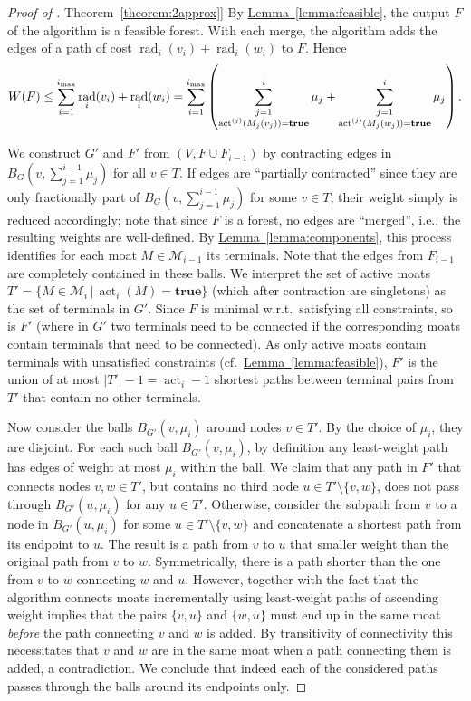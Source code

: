 \documentclass[letterpaper,11pt]{article}
\newcommand{\namedref}[2]{\hyperref[#2]{#1~\ref*{#2}}}
\newcommand{\theoremref}[1]{\namedref{Theorem}{#1}}
\newcommand{\lemmaref}[1]{\namedref{Lemma}{#1}}
\newcommand{\M}{\mathcal{M}}
\DeclareMathOperator{\act}{act}
\DeclareMathOperator{\moat}{rad}
\newcommand{\true}{\mathbf{true}}
\begin{document}
\begin{proof}[Proof of \theoremref{theorem:2approx}]
By \lemmaref{lemma:feasible}, the output $F$ of the algorithm is a feasible
forest. With each merge, the algorithm adds the edges of a path of cost
$\moat_i(v_i)+\moat_i(w_i)$ to $F$. Hence
\begin{equation*}
W(F)\leq  \sum_{i=1}^{i_{\max}}\moat_i(v_i)+\moat_i(w_i)\\
=  \sum_{i=1}^{i_{\max}}\left(\sum_{\substack{j=1\\ \act^{(j)}(M_j(v_j))=\true}}^i
\mu_j +\sum_{\substack{j=1\\ \act^{(j)}(M_j(w_j))=\true}}^i \mu_j\right).
\end{equation*}

We construct $G'$ and $F'$ from $(V,F\cup F_{i-1})$ by contracting edges in
$B_G(v,\sum_{j=1}^{i-1}\mu_j)$ for all $v\in T$. If edges are ``partially
contracted'' since they are only fractionally part of
$B_G(v,\sum_{j=1}^{i-1}\mu_j)$ for some $v\in T$, their weight simply is
reduced accordingly; note that since $F$ is a forest, no edges are ``merged'',
i.e., the resulting weights are well-defined. By \lemmaref{lemma:components},
this process identifies for each moat $M\in \M_{i-1}$ its terminals. Note that
the edges from $F_{i-1}$ are completely contained in these balls. We interpret
the set of active moats $T'=\{M\in \M_i\,|\,\act_i(M)=\true\}$ (which after
contraction are singletons) as the set of terminals in $G'$. Since $F$ is
minimal w.r.t.\ satisfying all constraints, so is $F'$ (where in $G'$ two
terminals need to be connected if the corresponding moats contain terminals
that need to be connected). As only active moats contain terminals with
unsatisfied constraints (cf.~\lemmaref{lemma:feasible}), $F'$ is the union of at
most $|T'|-1=\act_i-1$ shortest paths between terminal pairs from $T'$ that
contain no other terminals.

Now consider the balls $B_{G'}(v,\mu_i)$ around nodes $v\in T'$. By the choice
of $\mu_i$, they are disjoint. For each such ball $B_{G'}(v,\mu_i)$, by
definition any least-weight path has edges of weight at most $\mu_i$ within the
ball. We claim that any path in $F'$ that connects nodes $v,w\in T'$, but
contains no third node $u\in T'\setminus \{v,w\}$, does not pass through
$B_{G'}(u,\mu_i)$ for any $u\in T'$. Otherwise, consider the subpath from $v$
to a node in $B_{G'}(u,\mu_i)$ for some $u\in T'\setminus \{v,w\}$ and
concatenate a shortest path from its endpoint to $u$. The result is a path
from $v$ to $u$ that smaller weight than the original path from $v$ to $w$.
Symmetrically, there is a path shorter than the one from $v$ to $w$ connecting
$w$ and $u$. However, together with the fact that the algorithm connects moats
incrementally using least-weight paths of ascending weight implies that the
pairs $\{v,u\}$ and $\{w,u\}$ must end up in the same moat \emph{before} the
path connecting $v$ and $w$ is added. By transitivity of connectivity this
necessitates that $v$ and $w$ are in the same moat when a path connecting them
is added, a contradiction. We conclude that indeed each of the considered paths
passes through the balls around its endpoints only.


\end{proof}
\end{document}
